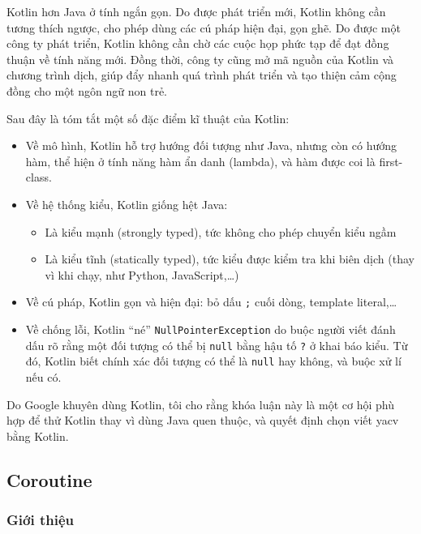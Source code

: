 \documentclass[../../thesis]{subfiles}
\begin{document}
Kotlin hơn Java ở tính ngắn gọn. Do được phát triển mới, Kotlin không cần tương
thích ngược, cho phép dùng các cú pháp hiện đại, gọn ghẽ. Do được một công ty
phát triển, Kotlin không cần chờ các cuộc họp phức tạp để đạt đồng thuận về tính
năng mới. Đồng thời, công ty cũng mở mã nguồn của Kotlin và chương trình dịch,
giúp đẩy nhanh quá trình phát triển và tạo thiện cảm cộng đồng cho một ngôn ngữ
non trẻ.

Sau đây là tóm tắt một số đặc điểm kĩ thuật của Kotlin:

\begin{itemize}
    \item
        Về mô hình, Kotlin hỗ trợ hướng đối tượng như Java, nhưng còn có hướng
        hàm, thể hiện ở tính năng hàm ẩn danh (lambda), và hàm được coi là
        first-class.
    \item
        Về hệ thống kiểu, Kotlin giống hệt Java:

        \begin{itemize}
            \item
                Là kiểu mạnh (strongly typed), tức không cho phép chuyển kiểu
                ngầm
            \item
                Là kiểu tĩnh (statically typed), tức kiểu được kiểm tra khi biên
                dịch (thay vì khi chạy, như Python, JavaScript,\ldots)
        \end{itemize}
    \item
        Về cú pháp, Kotlin gọn và hiện đại: bỏ dấu \texttt{;} cuối dòng,
        template literal,\ldots
    \item
        Về chống lỗi, Kotlin ``né'' \texttt{NullPointerException} do buộc người
        viết đánh dấu rõ rằng một đối tượng có thể bị \texttt{null} bằng hậu tố
        \texttt{?} ở khai báo kiểu. Từ đó, Kotlin biết chính xác đối tượng có
        thể là \texttt{null} hay không, và buộc xử lí nếu có.
\end{itemize}

Do Google khuyên dùng Kotlin, tôi cho rằng khóa luận này là một cơ hội phù hợp
để thử Kotlin thay vì dùng Java quen thuộc, và quyết định chọn viết yacv bằng
Kotlin.

\subsection{Coroutine}\label{sec:coroutine}

\subsubsection{Giới thiệu}
\end{document}
